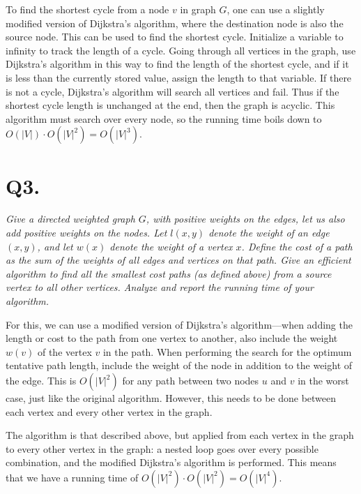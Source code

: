 \documentclass{article}
\begin{document}
To find the shortest cycle from a node $v$ in graph $G$, one can use a slightly modified version of Dijkstra's algorithm, where the destination node is also the source node. This can be used to find the shortest cycle. Initialize a variable to infinity to track the length of a cycle. Going through all vertices in the graph, use Dijkstra's algorithm in this way to find the length of the shortest cycle, and if it is less than the currently stored value, assign the length to that variable. If there is not a cycle, Dijkstra's algorithm will search all vertices and fail. Thus if the shortest cycle length is unchanged at the end, then the graph is acyclic. This algorithm must search over every node, so the running time boils down to $O(|V|)\cdot O(|V|^2) = O(|V|^3)$.







\section*{Q3. }

\textit{Give a directed weighted graph $G$, with positive weights on the edges, let us also add positive weights on the nodes. Let $l(x,y)$ denote the weight of an edge $(x,y)$, and let $w(x)$ denote the weight of a vertex $x$. Define the cost of a path as the sum of the weights of all edges and vertices on that path. Give an efficient algorithm to find all the smallest cost paths (as defined above) from a source vertex to all other vertices. Analyze and report the running time of your algorithm.}

For this, we can use a modified version of Dijkstra's algorithm---when adding the length or cost to the path from one vertex to another, also include the weight $w(v)$ of the vertex $v$ in the path. When performing the search for the optimum tentative path length, include the weight of the node in addition to the weight of the edge. This is $O(|V|^2)$ for any path between two nodes $u$ and $v$ in the worst case, just like the original algorithm. However, this needs to be done between each vertex and every other vertex in the graph.

The algorithm is that described above, but applied from each vertex in the graph to every other vertex in the graph: a nested loop goes over every possible combination, and the modified Dijkstra's algorithm is performed. This means that we have a running time of $O(|V|^2) \cdot O(|V|^2) = O(|V|^4)$.
\end{document}
